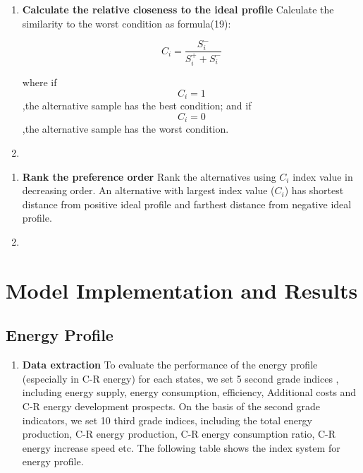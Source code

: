\documentclass{mcmthesis}
\begin{document}
\begin{enumerate}
        \begin{enumerate}
          \item \textbf{Calculate the relative closeness to the ideal profile}
         Calculate the similarity to the worst condition as formula(19):
            \begin{table}[!hbpt]
               \centering
               $$ C_{ { i } }=\frac { { S }_{ i }^{ - } }{ { S }_{ i }^{ + }+{ S }_{ i }^{ - } }  $$
             \end{table}
         where
         if $$ C_{i}=1 $$,the alternative sample has the best condition; and
         if $$ C_{i}=0 $$,the alternative sample has the worst condition.

            \item
           \end{enumerate}

        \begin{enumerate}
          \item \textbf{Rank the preference order}
        Rank the alternatives using $C_i$ index value in decreasing order. An alternative with largest index value ($C_i$) has shortest distance from positive ideal profile and farthest distance from negative ideal profile.

            \item
           \end{enumerate}

\section{Model Implementation and Results}
        \subsection{Energy Profile}

        \begin{enumerate}
          \item \textbf{Data extraction}
            To evaluate the performance of the energy profile (especially in C-R energy) for each states, we set 5 second grade indices , including energy supply, energy consumption, efficiency, Additional costs and C-R energy development prospects. On the basis of the second grade indicators, we set 10 third grade indices, including the total energy production, C-R energy production, C-R energy consumption ratio, C-R energy increase speed etc. The following table shows the index system for energy profile.


\end{enumerate}
\end{enumerate}
\end{document}
